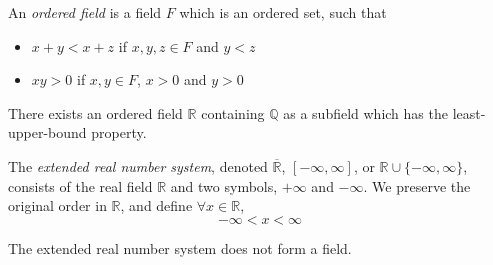 \documentclass{report}
\begin{document}
		\begin{defn} \label{def_ordered_field}
			An \emph{ordered field} is a field $F$ which is an ordered set, such that
			\begin{itemize}
				\item $x+y<x+z$ if $x,y,z \in F$ and $y<z$
				\item $xy>0$ if $x,y \in F$, $x>0$ and $y>0$
			\end{itemize}
			\end{defn}

		\begin{thm} \label{thm_existence_real_number}
			There exists an ordered field $\mathbb{R}$ containing $\mathbb{Q}$ as a subfield which has the least-upper-bound property.
		\end{thm}

		\begin{defn} \label{def_extended_real_number_system}
			The \emph{extended real number system}, denoted $\overline{\mathbb{R}}$, $[-\infty,\infty]$, or $\mathbb{R} \cup \{-\infty,\infty\}$, consists of the real field $\mathbb{R}$ and two symbols, $+\infty$ and $-\infty$. We preserve the original order in $\mathbb{R}$, and define $\forall x \in \mathbb{R}$,
			\begin{displaymath}
				-\infty<x<\infty
			\end{displaymath}
		\end{defn}

		\begin{remark} \label{remark_extended_real_number_system_not_field}
			The extended real number system does not form a field.
		\end{remark}
	
\end{document}
